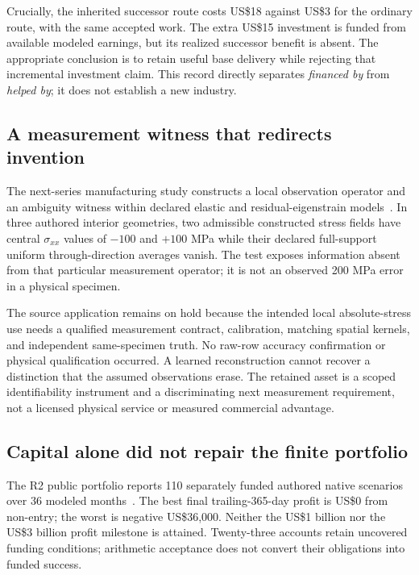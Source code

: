 \documentclass[10pt,a4paper]{article}
\begin{document}
Crucially, the inherited successor route costs US\$18 against US\$3 for the ordinary route, with the same accepted work. The extra US\$15 investment is funded from available modeled earnings, but its realized successor benefit is absent. The appropriate conclusion is to retain useful base delivery while rejecting that incremental investment claim. This record directly separates \emph{financed by} from \emph{helped by}; it does not establish a new industry.

\subsection{A measurement witness that redirects invention}

The next-series manufacturing study constructs a local observation operator and an ambiguity witness within declared elastic and residual-eigenstrain models~\citep{expn3}. In three authored interior geometries, two admissible constructed stress fields have central $\sigma_{xx}$ values of $-100$ and $+100$ MPa while their declared full-support uniform through-direction averages vanish. The test exposes information absent from that particular measurement operator; it is not an observed 200 MPa error in a physical specimen.

The source application remains on hold because the intended local absolute-stress use needs a qualified measurement contract, calibration, matching spatial kernels, and independent same-specimen truth. No raw-row accuracy confirmation or physical qualification occurred. A learned reconstruction cannot recover a distinction that the assumed observations erase. The retained asset is a scoped identifiability instrument and a discriminating next measurement requirement, not a licensed physical service or measured commercial advantage.

\subsection{Capital alone did not repair the finite portfolio}

The R2 public portfolio reports 110 separately funded authored native scenarios over 36 modeled months~\citep{expr2}. The best final trailing-365-day profit is US\$0 from non-entry; the worst is negative US\$36,000. Neither the US\$1 billion nor the US\$3 billion profit milestone is attained. Twenty-three accounts retain uncovered funding conditions; arithmetic acceptance does not convert their obligations into funded success.
\end{document}
